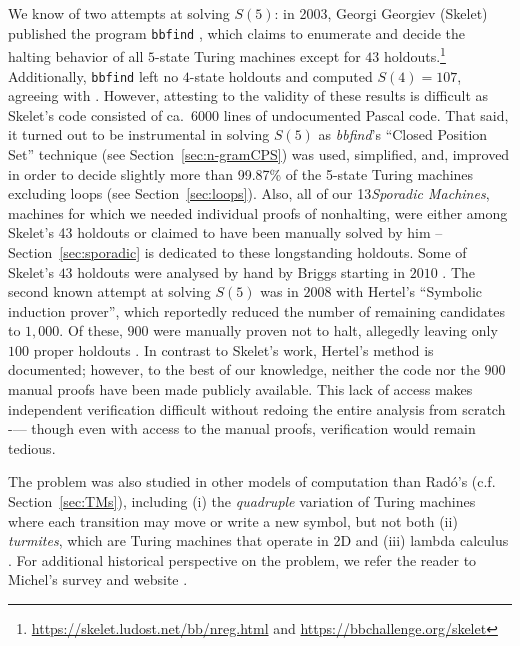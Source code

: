 \documentclass[a4paper,british]{article}
\theoremstyle{definition} %
\numberwithin{equation}{section}
\theoremstyle{definition} %
\newcommand{\ts}[1]{{\color{red}#1}}
\newcommand{\rado}{Rad\'o\xspace}
\newcommand{\numSporadic}{13\xspace}
\begin{document}
\newcommand{\SkeletHoldoutsSporadic}{\ts{XX}\xspace}

We know of two attempts at solving $S(5)$: in 2003, Georgi Georgiev (Skelet) published the program \texttt{bbfind} \cite{Skelet_bbfind}, which claims to enumerate and decide the halting behavior of all $5$-state Turing machines except for $43$ holdouts.\footnote{\url{https://skelet.ludost.net/bb/nreg.html} and \url{https://bbchallenge.org/skelet}} Additionally, \texttt{bbfind} left no $4$-state holdouts and computed $S(4) = 107$, agreeing with \cite{Brady83}. However, attesting to the validity of these results is difficult as Skelet's code consisted of ca.~6000 lines of undocumented Pascal code. That said, it turned out to be instrumental in solving $S(5)$ as \textit{bbfind}'s ``Closed Position Set'' technique (see Section~\ref{sec:n-gramCPS}) was used, simplified, and, improved in order to decide slightly more than 99.87\% of the 5-state Turing machines excluding loops (see Section~\ref{sec:loops}). Also, all of our \numSporadic \textit{Sporadic Machines}, \ie machines for which we needed individual proofs of nonhalting, were either among Skelet's 43 holdouts or claimed to have been manually solved by him -- Section~\ref{sec:sporadic} is dedicated to these longstanding holdouts. Some of Skelet's $43$ holdouts were analysed by hand by Briggs starting in $2010$ \cite{DanBriggs}. The second known attempt at solving $S(5)$ was in $2008$ with Hertel's ``Symbolic induction prover'', which reportedly reduced the number of remaining candidates to $1,000$. Of these, $900$ were manually proven not to halt, allegedly leaving only $100$ proper holdouts \cite{Hertel}. In contrast to Skelet’s work, Hertel’s method is documented; however, to the best of our knowledge, neither the code nor the $900$ manual proofs have been made publicly available. This lack of access makes independent verification difficult without redoing the entire analysis from scratch -— though even with access to the manual proofs, verification would remain tedious.

The \BBfull problem was also studied in other models of computation than \rado's (c.f. Section~\ref{sec:TMs}), including (i) the \textit{quadruple} variation of Turing machines where each transition may move or write a new symbol, but not both \cite{Ross2003,Ross2005} (ii) \textit{turmites}, which are Turing machines that operate in 2D \cite{BradyMeaningOfLife} and (iii) lambda calculus \cite{tromp_oeis}. For additional historical perspective on the \BBfull problem, we refer the reader to Michel's survey and website \cite{michel2019busy,PMichel_website}.
\end{document}
